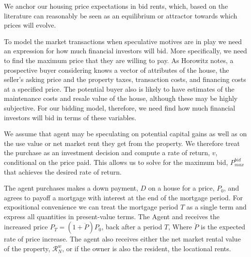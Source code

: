 
We anchor our housing price expectations in bid rents, which, based on the literature can reasonably be seen as an equilibrium or attractor towards which prices will evolve. 

To model the market transactions when speculative motives are in play we need an expression for how much financial investors will bid. More specifically, we need to find the maximum price that they are willing to pay. As Horowitz \cite{horowitzBiddingModelsHousing1986} notes, a prospective buyer  considering knows a vector of attributes of the house, the seller’s asking price and the property taxes, transaction costs, and financing costs at a specified price. The  potential buyer also is likely to have estimates of the maintenance costs and resale value of the house, although these may be highly subjective. For our bidding model, therefore, we need find how much financial investors will bid in terms of these variables.

 We assume that agent may be  speculating on potential \glspl{capital gain} as well as on the \gls{use value} or net market rent they get from the property. We therefore treat the purchase as an investment decision and compute a rate of return, $v$, conditional on the price paid. This allows us to solve for the maximum bid, $P_{max}^{bid}$ that achieves the desired rate of return. 
    
 The agent purchases makes a down payment, $D$ on a house for a price, $P_0$, and agrees to payoff a mortgage with interest at the end of the mortgage period. For expositional convenience we can treat the mortgage period $T$ as a single term and express all quantities  in present-value terms. The Agent 
 and receives the increased price $P_T = (1 + \dot P)P_0$, back after a period $T$, Where $\dot P$ is the expected rate of price increase. The agent also receives either the net market rental value of the property, $\mathcal{R}^w_N$, or if the owner is also the resident, the locational rents.

